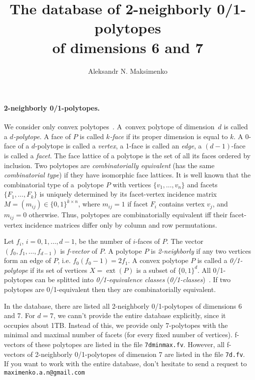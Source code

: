 \documentclass[12pt]{article}
\DeclareMathOperator{\ext}{ext} %
\begin{document}
\title{The database of 2-neighborly 0/1-polytopes\\ of dimensions 6 and 7}
\author{Aleksandr N. Maksimenko}
\maketitle

\paragraph{2-neighborly 0/1-polytopes.}
We consider only convex polytopes~\cite{Grunbaum:2003}.
A~convex polytope of dimension~$d$ is called a \emph{$d$-polytope}.
A face of $P$ is called \emph{$k$-face} if its proper dimension is equal to $k$.
A 0-face of a $d$-polytope is called a \emph{vertex}, a 1-face is called an \emph{edge}, a $(d-1)$-face is called a \emph{facet}. The face lattice of a polytope is the set of all its faces ordered by inclusion.
Two polytopes are \emph{combinatorially equivalent} (has the same \emph{combinatorial type}) if they have isomorphic face lattices.
It is well known that the combinatorial type of a~polytope $P$ with vertices $\{v_1, \dots, v_n\}$  and facets $\{F_1, \dots, F_k\}$ is uniquely determined by its facet-vertex incidence matrix $M = (m_{ij}) \in \{0,1\}^{k \times n}$, where $m_{ij} = 1$ if facet $F_i$ contains vertex $v_j$, and $m_{ij} = 0$ otherwise.
Thus, polytopes are combinatorially equivalent iff their facet-vertex incidence matrices differ only by column and row permutations.

Let $f_i$, $i=0,1,\dots,d-1$, be the number of $i$-faces of $P$.
The vector $(f_0, f_1, \dots, f_{d-1})$ is \emph{f-vector} of $P$.
A polytope $P$ is \emph{2-neighborly} if any two vertices form an edge of $P$,
i.e. $f_0 (f_0 - 1) = 2 f_1$.
A convex polytope $P$ is called a \emph{0/1-polytope} if its set of vertices $X = \ext(P)$ is a subset of $\{0,1\}^d$. All 0/1-polytopes can be splitted into \emph{0/1-equivalence classes} (\emph{0/1-classes})~\cite{Ziegler:2000}.
If two polytopes are 0/1-equivalent then they are combinatorially equivalent.

In the database, there are listed all 2-neighborly 0/1-polytopes of dimensions 6 and 7.
For $d=7$, we cann't provide the entire database explicitly, since it occupies about 1TB.
Instead of this, we provide only 7-polytopes with the minimal and maximal number of facets (for every fixed number of vertices). f-vectors of these polytopes are listed in the file \texttt{7dminmax.fv}.
However, all f-vectors of 2-neighborly 0/1-polytopes of dimension 7 are listed in the file \texttt{7d.fv}.
If you want to work with the entire database, don't hesitate to send a request to \texttt{maximenko.a.n@gmail.com}
\end{document}
